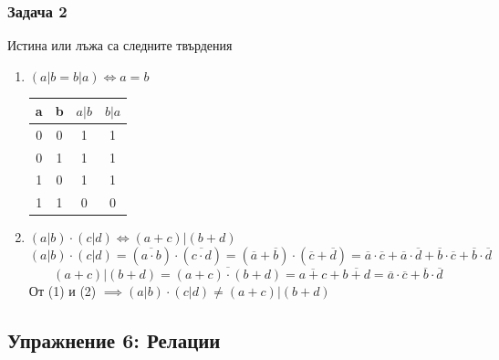 \documentclass[fleqn, 12pt]{article}
\theoremstyle{definition}
\begin{document}
\subsubsection*{Задача 2}
Истина или лъжа са следните твърдения 
\begin{enumerate}
\item $(a \vert b = b \vert a) \Leftrightarrow a = b$ 
\begin{table}[htp]
\begin{center}
\begin{tabular}{|c|c|c|c|} 
\hline
a & b & $a \vert b$ & $b \vert a$\\
\hline
0 & 0 & 1 & 1 \\
\hline
0 & 1 & 1 & 1 \\
\hline
1 & 0 & 1 & 1 \\
\hline
1 & 1 & 0 & 0 \\
\hline
\end{tabular}
\end{center}
\end{table}
\item $(a \vert b) \cdot (c \vert d) \Leftrightarrow (a+c) \vert (b+d) $
\begin{equation}
(a \vert b) \cdot (c \vert d) =
 (\overline{a \cdot b}) \cdot (\overline{c \cdot d}) = 
(\overline{a} + \overline{b}) \cdot (\overline{c} + \overline{d}) = 
\overline{a} \cdot \overline{c} + \overline{a} \cdot \overline{d} + \overline{b} \cdot \overline{c} + \overline{b} \cdot \overline{d}
\end{equation}
\begin{equation}
(a+c) \vert (b+d) = 
\overline{(a+c) \cdot (b+d)} =
\overline{a+c} + \overline{b + d} = 
\overline{a} \cdot \overline{c} + \overline{b} \cdot \overline{d}
\end{equation}
От (1) и (2) $\implies (a \vert b) \cdot (c \vert d) \neq (a+c) \vert (b+d)$
\end{enumerate}
\newpage
\subsection{Упражнение 6: Релации }
\end{document}
